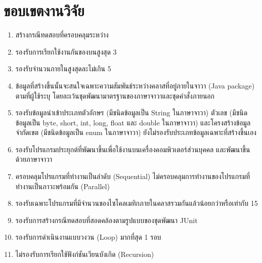 \section{ขอบเขตงานวิจัย}
\label{sec:limitation}

\begin{enumerate}
    \label{enu:limitation}
    \item สร้างกรณีทดสอบที่ครอบคลุม{\TestPath}ระหว่าง{\CUT} \label{enu:lim:tc}
    \item รองรับการเรียกใช้งานกันของ{\CUT}บน{\TestPath}สูงสุด 3 {\class} \label{enu:lim:3linkingclass}
    \item รองรับจำนวน{\method}ภายใน{\CUT}สูงสุด{\class}ละไม่เกิน 5 {\method} \label{enu:lim:5methods}
    \item ข้อมูล{\scg}ที่สร้างขึ้นนั้นจะสนใจเฉพาะความสัมพันธ์ระหว่างคลาสที่อยู่ภายใน{\Package}จาวา (Java package) ตามที่ผู้ใช้ระบุ 
        โดยละเว้นชุดพัฒนามาตรฐานของภาษาจาวาและชุดคำสั่งภายนอก \label{enu:lim:scg}
    \item รองรับข้อมูลนำเข้าประเภทตัวอักษร (มีชนิดข้อมูลเป็น String ในภาษาจาวา) ตัวเลข 
        (มีชนิดข้อมูลเป็น byte, short, int, long, float และ double ในภาษาจาวา) และโครงสร้างข้อมูลจำกัดเขต (มีชนิดข้อมูลเป็น enum ในภาษาจาวา) 
        ยังไม่รองรับประเภทข้อมูลเฉพาะที่สร้างขึ้นเอง \label{enu:lim:datatype}
    \item รองรับโปรแกรมประยุกต์ที่พัฒนาขึ้นเพื่อใช้งานบนเครื่องคอมพิวเตอร์ส่วนบุคคล และ{\sourcecode}พัฒนาขึ้นด้วยภาษาจาวา  \label{enu:lim:datatype}
    \item ครอบคลุมโปรแกรมที่ทำงานเป็นลำดับ (Sequential) ไม่ครอบคลุมการทำงานของโปรแกรมที่ทำงานเป็นภาวะพร้อมกัน (Parallel) \label{enu:lim:seq}
    \item รองรับเฉพาะโปรแกรมที่มีจำนวนของไซโคลเมทิกภายในคลาสรวมกันแล้วน้อยกว่าหรือเท่ากับ 15
    \item รองรับการสร้างกรณีทดสอบที่สอดคล้องตามรูปแบบของชุดพัฒนา JUnit
    \item รองรับการดำเนินงานแบบวงวน (Loop) มากที่สุด 1 รอบ \label{enu:lim:loop}
    \item ไม่รองรับการเรียกใช้ฟังก์ชันเวียนบังเกิด (Recursion)
\end{enumerate}
